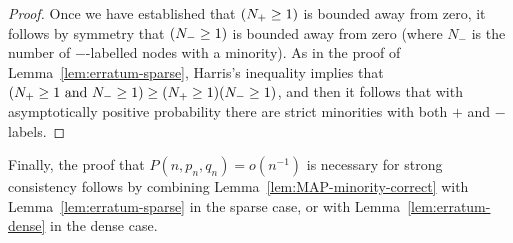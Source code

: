 \documentclass[EJP,final]{ejpecp}
\newcommand{\1}[1]{\mathbbm{1}_{\{#1\}}}
\let\Pr\relax
\DeclareMathOperator{\Pr}{Pr}
\begin{document}
\begin{proof}
    Once we have established that $\Pr(N_+ \ge 1)$ is bounded away from zero,
    it follows by symmetry that $\Pr(N_- \ge 1)$ is bounded away from zero (where $N_-$ is the number of $-$-labelled nodes with a minority). As in the proof of Lemma~\ref{lem:erratum-sparse}, Harris's inequality implies that $\Pr(N_+ \ge 1 \text{ and } N_- \ge 1) \ge \Pr(N_+ \ge 1) \Pr(N_- \ge 1)$, and then it follows that with asymptotically positive probability there are strict minorities with both $+$ and $-$ labels.
\end{proof}

Finally, the proof that $P(n, p_n, q_n) = o(n^{-1})$ is necessary for strong
consistency follows by combining Lemma~\ref{lem:MAP-minority-correct} with Lemma~\ref{lem:erratum-sparse}
in the sparse case, or with Lemma~\ref{lem:erratum-dense} in the dense case.



\end{document}
